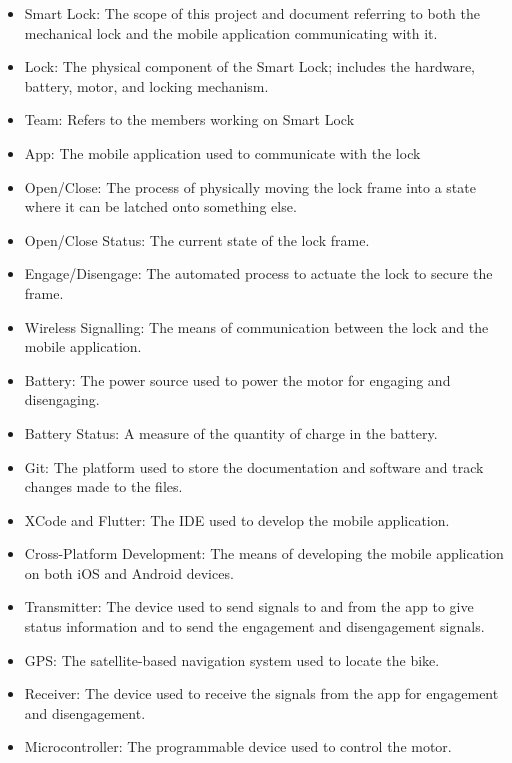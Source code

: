 \documentclass[12pt]{article}
\begin{document}
\begin{itemize}
\item Smart Lock: The scope of this project and document referring to both the mechanical lock and the mobile application communicating with it. 
\item Lock: The physical component of the Smart Lock; includes the hardware, battery, motor, and locking mechanism.  
\item Team: Refers to the members working on Smart Lock 
\item App: The mobile application used to communicate with the lock 
\item Open/Close: The process of physically moving the lock frame into a state where it can be latched onto something else. 
\item Open/Close Status: The current state of the lock frame. 
\item Engage/Disengage: The automated process to actuate the lock to secure the frame. 
\item Wireless Signalling: The means of communication between the lock and the mobile application. 
\item Battery: The power source used to power the motor for engaging and disengaging. 
\item Battery Status: A measure of the quantity of charge in the battery. 
\item Git: The platform used to store the documentation and software and track changes made to the files. 
\item XCode and Flutter: The IDE used to develop the mobile application. 
\item Cross-Platform Development: The means of developing the mobile application on both iOS and Android devices. 
\item Transmitter: The device used to send signals to and from the app to give status information and to send the engagement and disengagement signals. 
\item GPS: The satellite-based navigation system used to locate the bike. 
\item Receiver: The device used to receive the signals from the app for engagement and disengagement. 
\item Microcontroller: The programmable device used to control the motor. 
\end{itemize}
~\newpage
\end{document}
